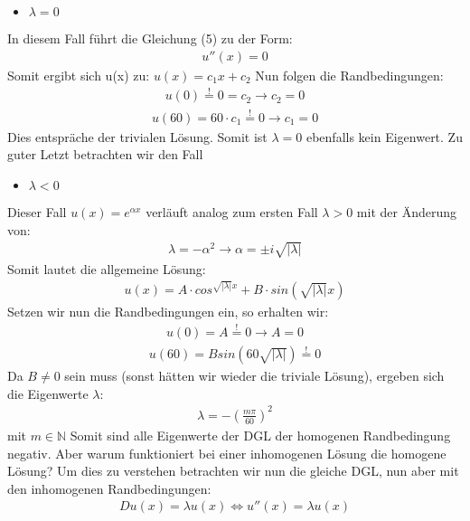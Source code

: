 \documentclass[ngerman]{scrartcl}
\begin{document}
\begin{itemize}
	\item $\lambda = 0$
\end{itemize}
In diesem Fall führt die Gleichung (5) zu der Form:
\begin{align}
u''(x) = 0
\end{align}
Somit ergibt sich u(x) zu: $u(x) = c_1 x +c_2$ Nun folgen die Randbedingungen: 
\begin{align}
u(0) \overset{!}{=} 0 = c_2 \rightarrow c_2 = 0
\end{align}
\begin{align}
u(60) = 60 \cdot c_1 \overset{!}{=} 0 \rightarrow c_1 = 0
\end{align}
Dies entspräche der trivialen Lösung. Somit ist $\lambda = 0$ ebenfalls kein Eigenwert.
Zu guter Letzt betrachten wir den Fall
\begin{itemize}
	\item $\lambda < 0$	
\end{itemize}
Dieser Fall $u(x) = e^{\alpha x}$ verläuft analog zum ersten Fall $\lambda > 0$ mit der Änderung von:
\begin{align}
\lambda = - \alpha^2 \rightarrow \alpha = \pm i \sqrt{|\lambda|}
\end{align}
Somit lautet die allgemeine Lösung:
\begin{align}
u(x) = A \cdot cos^{\sqrt{|\lambda|} x} + B \cdot sin(\sqrt{|\lambda|} x)
\end{align}
Setzen wir nun die Randbedingungen ein, so erhalten wir: 
\begin{align}
u(0) = A \overset{!}{=} 0 \rightarrow A = 0
\end{align}
\begin{align}
u(60) = B sin(60 \sqrt{|\lambda|}) \overset{!}{=} 0
\end{align}
Da $B \neq 0$ sein muss (sonst hätten wir wieder die triviale Lösung), ergeben sich die Eigenwerte $\lambda$: 
\begin{align}
\lambda = -(\frac{m \pi}{60})^2
\end{align} mit $m \in \mathbb{N}$
Somit sind alle Eigenwerte der DGL der homogenen Randbedingung negativ. \newline
Aber warum funktioniert bei einer inhomogenen Lösung die homogene Lösung? Um dies zu verstehen betrachten wir nun die gleiche DGL, nun aber mit den inhomogenen Randbedingungen:
\begin{align}
D u(x) = \lambda u(x) \Leftrightarrow u''(x) =\lambda u(x)
\end{align}
\end{document}

